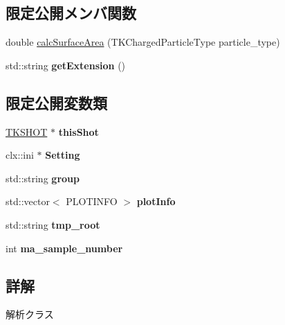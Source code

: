 \subsection*{限定公開メンバ関数}
\begin{DoxyCompactItemize}
\item 
double \hyperlink{class_t_k_a_n_a_l_y_z_e_ae7ea90bd92b92e5e75f89a5c5c6bbabb}{calc\+Surface\+Area} (T\+K\+Charged\+Particle\+Type particle\+\_\+type)
\item 
\mbox{\label{class_t_k_a_n_a_l_y_z_e_a95a34d1c96187a0a4ba8ec994b8ea040}} 
std\+::string {\bfseries get\+Extension} ()
\end{DoxyCompactItemize}
\subsection*{限定公開変数類}
\begin{DoxyCompactItemize}
\item 
\mbox{\label{class_t_k_a_n_a_l_y_z_e_a9413390f419657d838a950ad91198b2d}} 
\hyperlink{class_t_k_s_h_o_t}{T\+K\+S\+H\+OT} $\ast$ {\bfseries this\+Shot}
\item 
\mbox{\label{class_t_k_a_n_a_l_y_z_e_a8ef97d5dda7259043e08c5d80dc321d0}} 
clx\+::ini $\ast$ {\bfseries Setting}
\item 
\mbox{\label{class_t_k_a_n_a_l_y_z_e_affe19e7048a316ab493835883d9d5568}} 
std\+::string {\bfseries group}
\item 
\mbox{\label{class_t_k_a_n_a_l_y_z_e_a15230e395923bdafd1b2ad44a931be02}} 
std\+::vector$<$ P\+L\+O\+T\+I\+N\+FO $>$ {\bfseries plot\+Info}
\item 
\mbox{\label{class_t_k_a_n_a_l_y_z_e_ad50f186a554e89e25385a98560a0714e}} 
std\+::string {\bfseries tmp\+\_\+root}
\item 
\mbox{\label{class_t_k_a_n_a_l_y_z_e_a7fd597ef5634b9ca6a346e305a0c1c23}} 
int {\bfseries ma\+\_\+sample\+\_\+number}
\end{DoxyCompactItemize}


\subsection{詳解}
解析クラス

